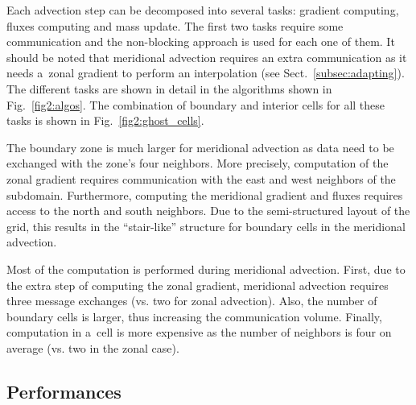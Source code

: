    Each advection step can be decomposed into several tasks: gradient
   computing, fluxes computing and mass update. The first two tasks
   require some communication and the non-blocking approach is used
   for each one of them. It should be noted that meridional advection
   requires an extra communication as it needs a~zonal gradient to
   perform an interpolation (see Sect.~\ref{subsec:adapting}). The
   different tasks are shown in detail in the algorithms shown in
   Fig.~\ref{fig2:algos}. The combination of boundary and
   interior cells for all these tasks is shown in Fig.~\ref{fig2:ghost_cells}.

   The boundary zone is much larger for meridional advection as data
   need to be exchanged with the zone's four neighbors. More precisely,
   computation of the zonal gradient requires communication with the
   east and west neighbors of the subdomain. Furthermore, computing
   the meridional gradient and fluxes requires access to the north and
   south neighbors. Due to the semi-structured layout of the grid,
   this results in the ``stair-like'' structure for boundary cells in
   the meridional advection.

   Most of the computation is performed during meridional
   advection. First, due to the extra step of computing the zonal
   gradient, meridional advection requires three message exchanges (vs.
   two for zonal advection). Also, the number of boundary cells is
   larger, thus increasing the communication volume. Finally,
   computation in a~cell is more expensive as the number of neighbors
   is four on average (vs. two in the zonal case).

   \subsection{Performances}
   \label{subsec:performances}


